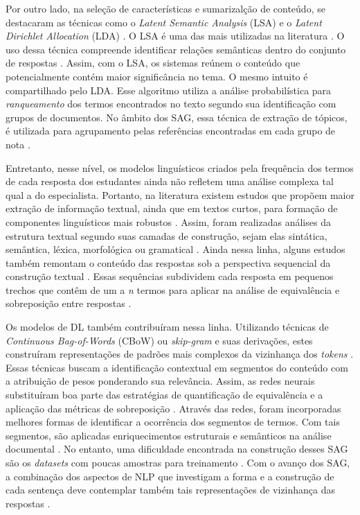 Por outro lado, na seleção de características e sumarizalção de conteúdo, se destacaram as técnicas como o \textit{Latent Semantic Analysis} (LSA) \cite{landauer1998} e o \textit{Latent Dirichlet Allocation} (LDA) \cite{blei2003}. O LSA é uma das mais utilizadas na literatura \cite{basu2013, sahu2020}. O uso dessa técnica compreende identificar relações semânticas dentro do conjunto de respostas \cite{mohler2009}. Assim, com o LSA, os sistemas reúnem o conteúdo que potencialmente contém maior significância no tema. O mesmo intuito é compartilhado pelo LDA. Esse algoritmo utiliza a análise probabilística para \textit{ranqueamento} dos termos encontrados no texto segundo sua identificação com grupos de documentos. No âmbito dos SAG, essa técnica de extração de tópicos, é utilizada para agrupamento pelas referências encontradas em cada grupo de nota \cite{basu2013, zhang2022}.

Entretanto, nesse nível, os modelos linguísticos criados pela frequência dos termos de cada resposta dos estudantes ainda não refletem uma análise complexa tal qual a do especialista. Portanto, na literatura existem estudos que propõem maior extração de informação textual, ainda que em textos curtos, para formação de componentes linguísticos mais robustos \cite{saha2018, zesch2018}. Assim, foram realizadas análises da estrutura textual segundo suas camadas de construção, sejam elas sintática, semântica, léxica, morfológica ou gramatical \cite{ramachandran2015b, roy2016}. Ainda nessa linha, alguns estudos também remontam o conteúdo das respostas sob a perspectiva sequencial da construção textual \cite{kumar2017}. Essas sequências subdividem cada resposta em pequenos trechos que contêm de um a \textit{n} termos para aplicar na análise de equivalência e sobreposição entre respostas \cite{jimenez2013, sakaguchi2015, sultan2016}.

Os modelos de DL também contribuíram nessa linha. Utilizando técnicas de \textit{Continuous Bag-of-Words} (CBoW) ou \textit{skip-gram} e suas derivações, estes construíram representações de padrões mais complexos da vizinhança dos \textit{tokens} \cite{mikolov2013}. Essas técnicas buscam a identificação contextual em segmentos do conteúdo com a atribuição de pesos ponderando sua relevância. Assim, as redes neurais substituíram boa parte das estratégias de quantificação de equivalência e a aplicação das métricas de sobreposição \cite{haller2022}. Através das redes, foram incorporadas melhores formas de identificar a ocorrência dos segmentos de termos. Com tais segmentos, são aplicadas enriquecimentos estruturais e semânticos na análise documental \cite{camus2020}. No entanto, uma dificuldade encontrada na construção desses SAG são os \textit{datasets} com poucas amostras para treinamento \cite{bonthu2021}. Com o avanço dos SAG, a combinação dos aspectos de NLP que investigam a forma e a construção de cada sentença deve contemplar também tais representações de vizinhança das respostas \cite{riordan2019, kumar2019}.


